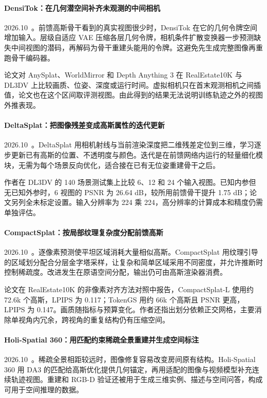 \paragraph{DensiTok：在几何潜空间补齐未观测的中间相机}
2026.10~\cite{2610_07958}。前馈高斯骨干看到的真实视图很少时，DensiTok 在它的几何令牌空间增加输入。层级自适应 VAE 压缩各层几何令牌，相机条件扩散变换器一步预测缺失中间视图的潜码，再解码为骨干重建头能用的令牌。这避免先生成完整图像再重跑骨干编码器。

论文对 AnySplat、WorldMirror 和 Depth Anything 3 在 RealEstate10K 与 DL3DV 上比较画质、位姿、深度或运行时间。虚拟相机只在首末观测相机之间插值，论文也在这个区间取评测视图。由此得到的结果无法说明训练轨迹之外的视图外推表现。

\paragraph{DeltaSplat：把图像残差变成高斯属性的迭代更新}
2026.10~\cite{2610_09853}。DeltaSplat 用相机射线与当前渲染深度把二维残差定位到三维，学习逐步更新已有高斯的位置、不透明度与颜色。迭代是在前馈网络内运行的轻量细化模块，无需为每个场景反向优化，适合接在已有无位姿重建骨干之后。

作者在 DL3DV 的 140 场景测试集上比较 6、12 和 24 个输入视图。已知内参但无已知外参时，6 视图的 PSNR 为 26.64 dB，较所用前馈骨干提升 1.75 dB；论文另列全未标定设置。输入分辨率为 224 乘 224，高分辨率的计算成本和精度仍需单独评估。

\paragraph{CompactSplat：按局部纹理复杂度分配前馈高斯}
2026.10~\cite{2610_13177}。逐像素预测使平坦区域消耗大量相似高斯。CompactSplat 用纹理引导的区域划分配合分层金字塔采样，让复杂和简单区域采用不同密度，并允许推断时控制稀疏度。改进发生在原语空间分配，输出仍可由高斯渲染器消费。

论文在 RealEstate10K 的非像素对齐方法对照中报告，CompactSplat-L 使用约 72.6k 个高斯，LPIPS 为 0.117；TokenGS 用约 66k 个高斯且 PSNR 更高，LPIPS 为 0.147。画质随指标与预算变化。作者还指出划分依赖正交网格，主要消除单视角内冗余，跨视角的重复结构仍有压缩空间。

\paragraph{Holi-Spatial 360：用匹配约束稀疏全景重建并生成空间标注}
2026.10~\cite{2610_19502}。稀疏全景相距较远时，图像修复容易改变房间原有结构。Holi-Spatial 360 用 DA3 的匹配给高斯优化提供几何锚定，再用适配的图像与视频模型补充连续轨迹视图。重建和 RGB-D 验证还被用于生成三维实例、描述与空间问答，构成可用于空间推理的数据。

